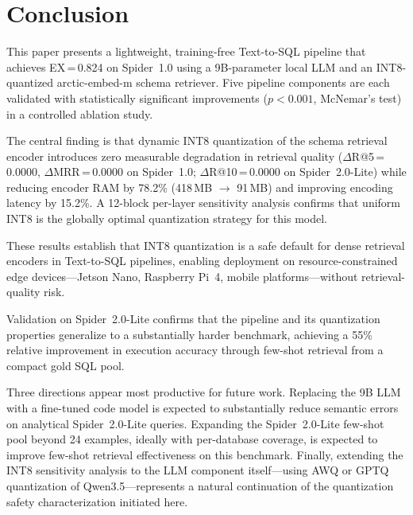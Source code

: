 \section{Conclusion}
\label{sec:conclusion}

This paper presents a lightweight, training-free Text-to-SQL pipeline
that achieves EX\,=\,0.824 on Spider~1.0 using a 9B-parameter local LLM
and an INT8-quantized arctic-embed-m schema retriever.
Five pipeline components are each validated with statistically significant
improvements ($p < 0.001$, McNemar's test) in a controlled ablation study.

The central finding is that dynamic INT8 quantization of the schema
retrieval encoder introduces zero measurable degradation in retrieval
quality ($\Delta$R@5\,=\,0.0000, $\Delta$MRR\,=\,0.0000 on Spider~1.0;
$\Delta$R@10\,=\,0.0000 on Spider~2.0-Lite) while reducing encoder RAM
by 78.2\% (418\,MB $\to$ 91\,MB) and improving encoding latency by 15.2\%.
A 12-block per-layer sensitivity analysis confirms that uniform INT8
is the globally optimal quantization strategy for this model.

These results establish that INT8 quantization is a safe default for
dense retrieval encoders in Text-to-SQL pipelines, enabling
deployment on resource-constrained edge devices---Jetson Nano,
Raspberry Pi~4, mobile platforms---without retrieval-quality risk.

Validation on Spider~2.0-Lite confirms that the pipeline and
its quantization properties generalize to a substantially harder
benchmark, achieving a 55\% relative improvement in execution accuracy
through few-shot retrieval from a compact gold SQL pool.

Three directions appear most productive for future work.
Replacing the 9B LLM with a fine-tuned code model is expected to
substantially reduce semantic errors on analytical Spider~2.0-Lite queries.
Expanding the Spider~2.0-Lite few-shot pool beyond 24 examples, ideally
with per-database coverage, is expected to improve few-shot retrieval
effectiveness on this benchmark.
Finally, extending the INT8 sensitivity analysis to the LLM component
itself---using AWQ or GPTQ quantization of Qwen3.5---represents a natural
continuation of the quantization safety characterization initiated here.
